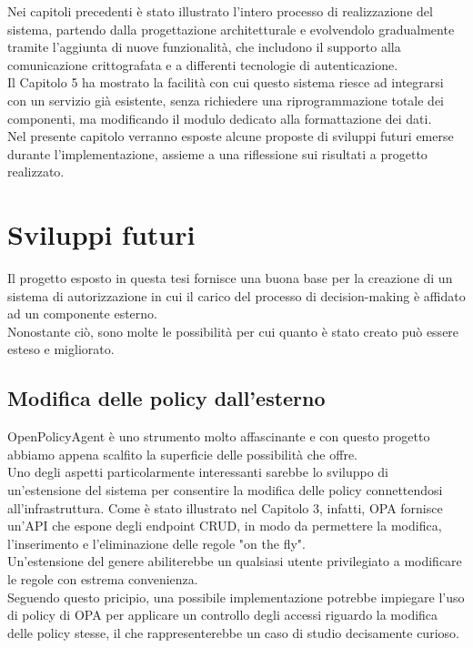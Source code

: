 Nei capitoli precedenti è stato illustrato l'intero processo di realizzazione del sistema, partendo dalla
progettazione architetturale e evolvendolo gradualmente tramite l'aggiunta di nuove funzionalità, che includono il supporto alla comunicazione crittografata 
e a differenti tecnologie di autenticazione. 
\\ Il Capitolo 5 ha mostrato la facilità 
con cui questo sistema riesce ad integrarsi con un servizio già esistente, senza richiedere una 
riprogrammazione totale dei componenti, ma modificando il modulo dedicato alla formattazione dei dati. 
\\ Nel presente capitolo verranno esposte alcune proposte di sviluppi futuri emerse durante l'implementazione, assieme a una riflessione
 sui risultati a progetto realizzato. 

\section{Sviluppi futuri}
Il progetto esposto in questa tesi fornisce una buona base per la creazione di un sistema di autorizzazione 
in cui il carico del processo di decision-making è affidato ad un componente esterno.  
\\ Nonostante ciò, sono molte le possibilità per cui quanto è stato creato può essere esteso e migliorato. 

\subsection{Modifica delle policy dall'esterno}
OpenPolicyAgent è uno strumento molto affascinante e con questo progetto abbiamo 
appena scalfito la superficie delle possibilità che offre. \\ Uno degli aspetti particolarmente interessanti 
sarebbe lo sviluppo di un'estensione del sistema per consentire la modifica delle policy connettendosi all'infrastruttura. 
Come è stato illustrato nel Capitolo 3, infatti, OPA fornisce un'API che espone degli 
endpoint CRUD, in modo da permettere la modifica, l'inserimento e l'eliminazione delle regole "on the fly".
\\Un'estensione del genere abiliterebbe un qualsiasi utente privilegiato a modificare le regole con estrema
 convenienza.   
\\ Seguendo questo pricipio, una possibile implementazione potrebbe impiegare l'uso di policy di OPA per applicare un controllo degli accessi 
riguardo la modifica delle policy stesse, il che rappresenterebbe un caso di studio decisamente curioso. 

